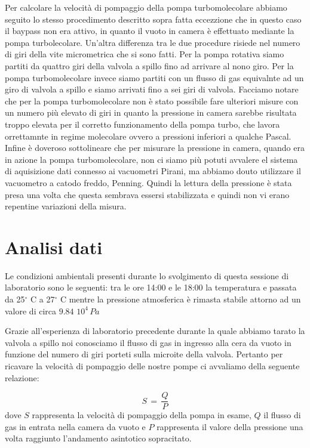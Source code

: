 Per calcolare la velocità di pompaggio della pompa turbomolecolare abbiamo seguito lo stesso procedimento descritto sopra fatta eccezzione che in questo caso il baypass non era attivo, in quanto il vuoto in camera è effettuato mediante la pompa turbolecolare.
Un'altra differenza tra le due procedure risiede nel numero di giri della vite micrometrica che si sono fatti. Per la pompa rotativa siamo partiti da quattro giri della valvola a spillo fino ad arrivare al nono giro. Per la pompa turbomolecolare invece siamo partiti con un flusso di gas equivalnte ad un giro di valvola a spillo e siamo arrivati fino a sei giri di valvola. Facciamo notare che per la pompa turbomolecolare non è stato possibile fare ulteriori misure con un numero più elevato di giri in quanto la pressione in camera sarebbe risultata troppo elevata per il corretto funzionamento della pompa turbo, che lavora orrettamnte in regime molecolare ovvero a pressioni inferiori a qualche Pascal.
Infine è doveroso sottolineare che per misurare la pressione in camera, quando era in azione la pompa turbomolecolare, non ci siamo più potuti avvalere el sistema di aquisizione dati connesso ai vacuometri Pirani, ma abbiamo douto utilizzare il vacuometro a catodo freddo, Penning. Quindi la lettura della pressione è stata presa una volta che questa sembrava essersi stabilizzata e quindi non vi erano repentine variazioni della misura.  

\section{Analisi dati}

Le condizioni ambientali presenti durante lo svolgimento di questa sessione di laboratorio sono le seguenti: tra le ore 14:00 e le 18:00 la temperatura e passata da 25$^\circ$ C a 27$^\circ$ C mentre la pressione atmosferica è rimasta stabile attorno ad un valore di circa $9.84\,\,10^4\, Pa$

Grazie all'esperienza di laboratorio precedente durante la quale abbiamo tarato la valvola a spillo noi conosciamo il flusso di gas in ingresso alla cera da vuoto in funzione del numero di giri porteti sulla microite della valvola.
Pertanto per ricavare la velocità di pompaggio delle nostre pompe ci avvaliamo della seguente relazione:

\begin{equation}
	S \,=\, \frac{Q}{P}
\end{equation}
%
dove $S$ rappresenta la velocità di pompaggio della pompa in esame, $Q$ il flusso di gas in entrata nella camera da vuoto e $P$ rappresenta il valore della pressione una volta raggiunto l'andamento asintotico sopracitato. 

